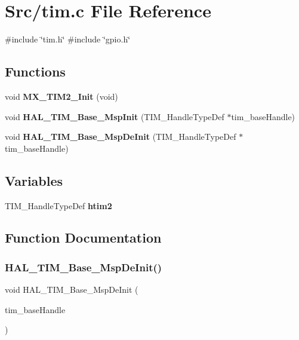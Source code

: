 \section{Src/tim.c File Reference}
\label{tim_8c}
{\ttfamily \#include \char`\"{}tim.\+h\char`\"{}}\newline
{\ttfamily \#include \char`\"{}gpio.\+h\char`\"{}}\newline
\subsection*{Functions}
\begin{DoxyCompactItemize}
\item 
void \textbf{ M\+X\+\_\+\+T\+I\+M2\+\_\+\+Init} (void)
\item 
void \textbf{ H\+A\+L\+\_\+\+T\+I\+M\+\_\+\+Base\+\_\+\+Msp\+Init} (T\+I\+M\+\_\+\+Handle\+Type\+Def $\ast$tim\+\_\+base\+Handle)
\item 
void \textbf{ H\+A\+L\+\_\+\+T\+I\+M\+\_\+\+Base\+\_\+\+Msp\+De\+Init} (T\+I\+M\+\_\+\+Handle\+Type\+Def $\ast$tim\+\_\+base\+Handle)
\end{DoxyCompactItemize}
\subsection*{Variables}
\begin{DoxyCompactItemize}
\item 
T\+I\+M\+\_\+\+Handle\+Type\+Def \textbf{ htim2}
\end{DoxyCompactItemize}


\subsection{Function Documentation}
\mbox{\label{tim_8c_adee8ed7d3ebb3a217c27ac10af86ce2f}} 
\subsubsection{H\+A\+L\+\_\+\+T\+I\+M\+\_\+\+Base\+\_\+\+Msp\+De\+Init()}
{\footnotesize\ttfamily void H\+A\+L\+\_\+\+T\+I\+M\+\_\+\+Base\+\_\+\+Msp\+De\+Init (\begin{DoxyParamCaption}\item[{T\+I\+M\+\_\+\+Handle\+Type\+Def $\ast$}]{tim\+\_\+base\+Handle }\end{DoxyParamCaption})}

